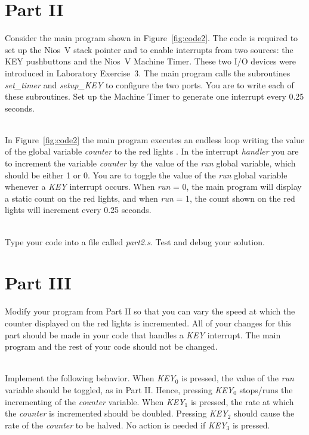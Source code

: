 \documentclass[epsfig,10pt,fullpage]{article}
\begin{document}
\newpage
\section*{ Part II}
Consider the main program shown in Figure~\ref{fig:code2}. The code is required to set up 
the Nios~V stack pointer and to enable interrupts from two sources: the KEY pushbuttons 
and the Nios~V Machine Timer.  These two I/O devices were introduced in Laboratory Exercise~3.
The main program calls the subroutines {\it set\_timer} and {\it setup\_KEY} to configure
the two ports. You are to write each of these subroutines. Set 
up the Machine Timer to generate one interrupt every 0.25 seconds.

~\\
In Figure~\ref{fig:code2} the main program executes an endless loop writing the value of
the global variable {\it counter} to the red lights .  In the interrupt
{\it handler} you are to increment the variable {\it counter} 
by the value of the {\it run} global variable, 
which should be either 1 or 0.  You are to toggle the value of the {\it run} global variable 
whenever a {\it KEY} interrupt occurs. 
When {\it run} = 0, the main program will display a static count on the red lights,
and when {\it run} = 1, the count shown on the red lights will increment every 0.25 seconds.

~\\
Type your code into a file called {\it part2.s}. Test and debug your solution.

\section*{ Part III}
Modify your program from Part II so that you can vary the speed at which the counter
displayed on the red lights  is incremented. All of your changes for this 
part should be made in your code that handles a {\it KEY} interrupt. The main program and 
the rest of your code should not be changed.

~\\
Implement the following behavior. When {\it KEY}$_0$ is pressed, the value of the {\it run}
variable should be toggled, as in Part II. Hence, pressing {\it KEY}$_0$ stops/runs
the incrementing of the {\it counter} variable. When {\it KEY}$_1$ is pressed, the rate at which
the {\it counter} is incremented should be doubled. Pressing {\it KEY}$_2$ should cause the rate 
of the {\it counter} to be halved. No action is needed if {\it KEY}$_3$ is pressed.
\end{document}
